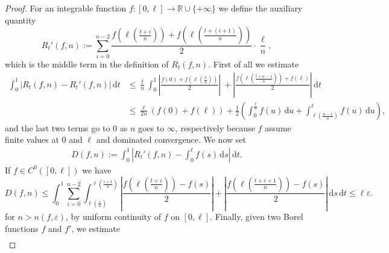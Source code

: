 \documentclass[12pt]{amsart}
\newcommand{\R}{\mathbb{R}}
\renewcommand{\d}{{\mathrm d}}
\theoremstyle{definition}
\begin{document}
\begin{proof}
    For an integrable function $f\colon [0,\ell] \to \R \cup \{+\infty\}$ we define the auxiliary quantity
    \begin{equation}
        R_t'(f,n) := \sum_{i=0}^{n-2}\frac{f\left(\ell\left(\frac{t+i}{n}\right)\right)+f\left(\ell\left(\frac{t+(i+1)}{n}\right)\right)}{2}\cdot\frac{\ell}{n},
    \end{equation}
    which is the middle term in the definition of $R_t(f,n)$. First of all we estimate
    \begin{equation}
        \label{eq:R_t-R_t'}
        \begin{aligned}
            \int_0^1\left\vert R_t(f,n) - R_t'(f,n)  \right\vert\,\d t &\le \frac{\ell}{n}\int_0^1\left\vert \frac{f(0) + f\left(\ell\left(\frac{t}{n}\right)\right)}{2} \right\vert\ + \left\vert \frac{f\left(\ell \left(\frac{t+n-1}{n}\right)\right) + f(\ell)}{2} \right\vert\,\d t \\
            &\le \frac{\ell}{2n}\left( f(0) + f(\ell)\right) + \frac{1}{2}\left(\int_0^{\frac{\ell}{n}} f(u)\,\d u + \int_{\ell\left(\frac{n-1}{n}\right)}^\ell f(u)\,\d u \right),
        \end{aligned}
    \end{equation}
    and the last two terms go to $0$ as $n$ goes to $\infty$, respectively because $f$ assume finite values at $0$ and $\ell$ and dominated convergence. We now set
    \begin{equation*}
    \begin{aligned}
        D(f,n):=\int_0^1 \left| R_t'(f,n) -\int_0^\ell f(s)\,\d s \right|\,\d t.
    \end{aligned}
    \end{equation*}
    If $f \in C^0([0,\ell])$ we have
    \begin{equation}
    \label{eq:hahn_computation1}
        D(f,n) \le \int_0^1 \sum_{i=0}^{n-2} \int_{\ell\left(\frac{i}{n}\right)}^{\ell\left(\frac{i+1}{n}\right)} \left| \frac{f\left(\ell\left(\frac{t+i}{n}\right)\right)-f(s)}{2}\right|+\left| \frac{f\left(\ell\left(\frac{t+i+1}{n}\right)\right)-f(s)}{2}\right|\,\d s\,\d t 
        \le \ell\varepsilon.
    \end{equation}
    for $n > n(f,\varepsilon)$, by uniform continuity of $f$ on $[0,\ell]$.
    Finally, given two Borel functions $f$ and $f'$, we estimate
    \begin{equation}
    \label{eq:hahn_computation2}
    \begin{aligned}

\end{aligned}
\end{equation}
\end{proof}
\end{document}
